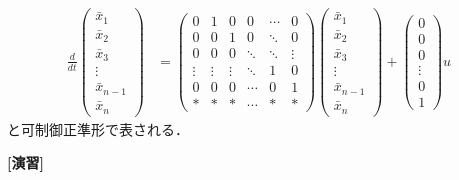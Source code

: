 \begin{align}
 \frac{d}{dt}
  \left(\begin{array}{c}
     \bar{x}_1 \\
	 \bar{x}_2 \\
	 \bar{x}_3 \\
	 \vdots \\
	 \bar{x}_{n-1} \\
	 \bar{x}_n
	\end{array}\right)
  &=
  \left(\begin{array}{cccccc}
     0      & 1      & 0      & 0      & \cdots & 0     \\
     0      & 0      & 1      & 0      & \ddots & 0     \\
	 0      & 0      & 0      & \ddots & \ddots & \vdots\\
	 \vdots & \vdots & \vdots & \ddots & 1      & 0     \\
	 0      & 0      & 0      & \cdots & 0      & 1     \\
	 *      & *      & *      & \cdots & *      & *
	\end{array}\right)
  \left(\begin{array}{c}
     \bar{x}_1 \\
	 \bar{x}_2 \\
	 \bar{x}_3 \\
	 \vdots \\
	 \bar{x}_{n-1} \\
	 \bar{x}_n
	\end{array}\right)
  +
  \left(\begin{array}{c}
     0 \\
	 0 \\
	 0 \\
	 \vdots \\
	 0 \\
	 1
	\end{array}\right)
  u 
\end{align}
と可制御正準形で表される．


\noindent
{\bf[演習]}\nopagebreak


